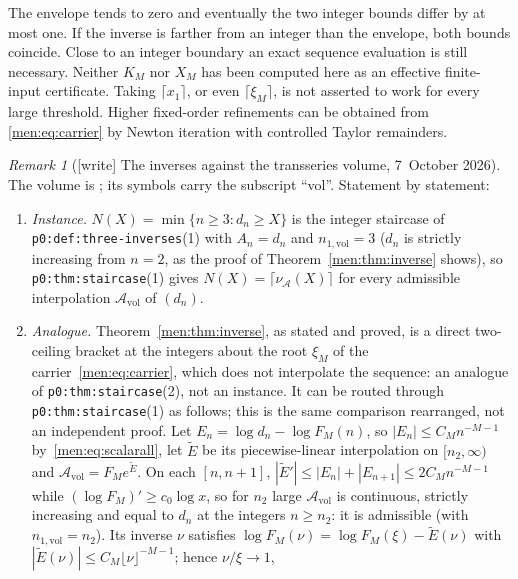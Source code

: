 \documentclass[11pt,letterpaper]{article}
\theoremstyle{remark}\newtheorem{remark}[theorem]{Remark}
\newcommand{\file}[1]{\nolinkurl{#1}}
\begin{document}
The envelope tends to zero and eventually the two integer bounds differ by at most one. If the inverse is farther from an integer than the envelope, both bounds coincide. Close to an integer boundary an exact sequence evaluation is still necessary. Neither $K_M$ nor $X_M$ has been computed here as an effective finite-input certificate. Taking $\lceil x_1\rceil$, or even $\lceil\xi_M\rceil$, is not asserted to work for every large threshold. Higher fixed-order refinements can be obtained from \eqref{men:eq:carrier} by Newton iteration with controlled Taylor remainders.

\begin{remark}[{[write]} The inverses against the transseries volume, 7~October 2026]\label{men:rem:transseries}
The volume is
;
its symbols carry the subscript ``vol''. Statement by statement:
\begin{enumerate}[label=(\alph*)]
\item \emph{Instance.} $N(X)=\min\{n\ge3:d_n\ge X\}$ is the integer
 staircase of \file{p0:def:three-inverses}(1) with $A_n=d_n$ and
 $n_{1,\mathrm{vol}}=3$ ($d_n$ is strictly increasing from $n=2$, as the
 proof of Theorem~\ref{men:thm:inverse} shows), so
 \file{p0:thm:staircase}(1) gives $N(X)=\lceil\nu_{\mathcal A}(X)\rceil$ for
 every admissible interpolation $\mathcal A_{\mathrm{vol}}$ of $(d_n)$.
\item \emph{Analogue.} Theorem~\ref{men:thm:inverse}, as stated and proved, is
 a direct two-ceiling bracket at the integers about the root $\xi_M$ of the
 carrier~\eqref{men:eq:carrier}, which does not interpolate the sequence: an
 analogue of \file{p0:thm:staircase}(2), not an instance. It can be routed
 through \file{p0:thm:staircase}(1) as follows; this is the same comparison
 rearranged, not an independent proof. Let $E_n=\log d_n-\log F_M(n)$, so
 $|E_n|\le C_Mn^{-M-1}$ by~\eqref{men:eq:scalarall}, let $\widetilde E$ be its
 piecewise-linear interpolation on $[n_2,\infty)$ and
 $\mathcal A_{\mathrm{vol}}=F_Me^{\widetilde E}$. On each $[n,n+1]$,
 $|\widetilde E'|\le|E_n|+|E_{n+1}|\le2C_Mn^{-M-1}$ while
 $(\log F_M)'\ge c_0\log x$, so for $n_2$ large $\mathcal A_{\mathrm{vol}}$ is
 continuous, strictly increasing and equal to $d_n$ at the integers
 $n\ge n_2$: it is admissible (with $n_{1,\mathrm{vol}}=n_2$). Its inverse
 $\nu$ satisfies $\log F_M(\nu)=\log F_M(\xi)-\widetilde E(\nu)$ with
 $|\widetilde E(\nu)|\le C_M\lfloor\nu\rfloor^{-M-1}$; hence $\nu/\xi\to1$,

\end{enumerate}
\end{remark}
\end{document}
